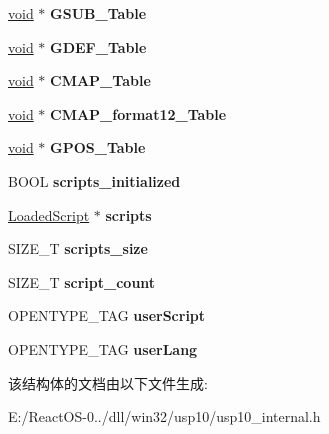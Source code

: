 \begin{DoxyCompactItemize}
\mbox{\label{struct_script_cache_aa8b27811b5a8f918f22d0f484c9ebd2e}} 
\hyperlink{interfacevoid}{void} $\ast$ {\bfseries G\+S\+U\+B\+\_\+\+Table}
\item 
\mbox{\label{struct_script_cache_a7b13d838d94ef536020db6da63a28da8}} 
\hyperlink{interfacevoid}{void} $\ast$ {\bfseries G\+D\+E\+F\+\_\+\+Table}
\item 
\mbox{\label{struct_script_cache_a8872a1286202909a29f2cec74a90b45a}} 
\hyperlink{interfacevoid}{void} $\ast$ {\bfseries C\+M\+A\+P\+\_\+\+Table}
\item 
\mbox{\label{struct_script_cache_a40a40632ff2b9c2d55f0ea867cbf33b4}} 
\hyperlink{interfacevoid}{void} $\ast$ {\bfseries C\+M\+A\+P\+\_\+format12\+\_\+\+Table}
\item 
\mbox{\label{struct_script_cache_a0425e19b72ea40831aad8177d55dff4a}} 
\hyperlink{interfacevoid}{void} $\ast$ {\bfseries G\+P\+O\+S\+\_\+\+Table}
\item 
\mbox{\label{struct_script_cache_a652907b5dffb84ef77fb916492f19597}} 
B\+O\+OL {\bfseries scripts\+\_\+initialized}
\item 
\mbox{\label{struct_script_cache_adb0094895dce5643a6573dfa0117f4b4}} 
\hyperlink{struct_loaded_script}{Loaded\+Script} $\ast$ {\bfseries scripts}
\item 
\mbox{\label{struct_script_cache_ae1638324bdcd751b3beaae635ba61f9c}} 
S\+I\+Z\+E\+\_\+T {\bfseries scripts\+\_\+size}
\item 
\mbox{\label{struct_script_cache_a7f70ba57c3bcab1bb9af6771414fe65c}} 
S\+I\+Z\+E\+\_\+T {\bfseries script\+\_\+count}
\item 
\mbox{\label{struct_script_cache_aed15d8db221352298c1cfe8c5ca5e987}} 
O\+P\+E\+N\+T\+Y\+P\+E\+\_\+\+T\+AG {\bfseries user\+Script}
\item 
\mbox{\label{struct_script_cache_a434fa3992ef03312446091c59405fe20}} 
O\+P\+E\+N\+T\+Y\+P\+E\+\_\+\+T\+AG {\bfseries user\+Lang}
\end{DoxyCompactItemize}


该结构体的文档由以下文件生成\+:\begin{DoxyCompactItemize}
\item 
E\+:/\+React\+O\+S-\/0../dll/win32/usp10/usp10\+\_\+internal.\+h\end{DoxyCompactItemize}
